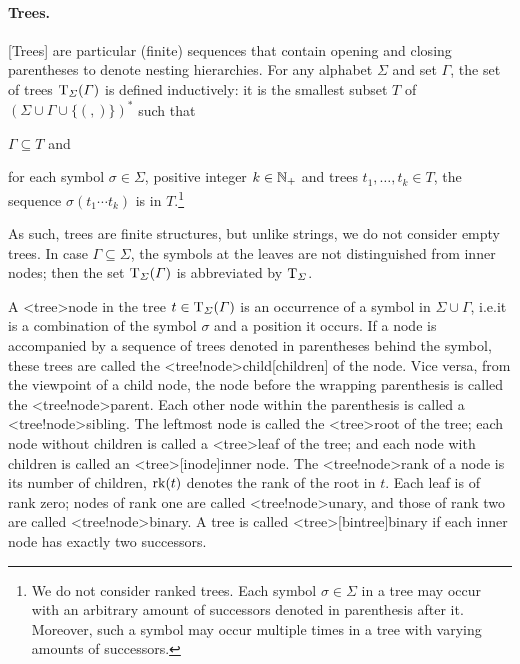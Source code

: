 \documentclass[../document.tex]{subfiles}
\begin{document}
    \paragraph{Trees.}
    [Trees] are particular (finite) sequences that contain opening and closing parentheses to denote nesting hierarchies.
    For any alphabet \(\varSigma\) and set \(\varGamma\), the set of trees \(\operatorname{T}_\varSigma(\varGamma)\) is defined inductively: it is the smallest subset \(T\) of \((\varSigma \cup \varGamma \cup \{ (, )\})^*\) such that
    \begin{inparaenum}
        \item \(\varGamma \subseteq T\) and
        \item for each symbol \(\sigma \in \varSigma\), positive integer \(k \in \mathbb{N}_+\) and trees \(t_1, \ldots, t_k \in T\), the sequence \(\sigma(t_1 \cdots t_k)\) is in \(T\).\footnote{
            We do not consider ranked trees.
            Each symbol \(\sigma \in \varSigma\) in a tree may occur with an arbitrary amount of successors denoted in parenthesis after it.
            Moreover, such a symbol may occur multiple times in a tree with varying amounts of successors.
        }
    \end{inparaenum}
    As such, trees are finite structures, but unlike strings, we do not consider empty trees.
    In case \(\varGamma \subseteq \varSigma\), the symbols at the leaves are not distinguished from inner nodes; then the set \(\operatorname{T}_\varSigma(\varGamma)\) is abbreviated by \(\operatorname{T}_\varSigma\).

    A <tree>{node} in the tree \(t \in \operatorname{T}_\varSigma(\varGamma)\) is an occurrence of a symbol in \(\varSigma \cup \varGamma\), i.e.\@ it is a combination of the symbol \(\sigma\) and a position it occurs.
    If a node is accompanied by a sequence of trees denoted in parentheses behind the symbol, these trees are called the <tree!node>{child}[children] of the node.
    Vice versa, from the viewpoint of a child node, the node before the wrapping parenthesis is called the <tree!node>{parent}.
    Each other node within the parenthesis is called a <tree!node>{sibling}.
    The leftmost node is called the <tree>{root} of the tree; each node without children is called a <tree>{leaf} of the tree; and each node with children is called an <tree>[inode]{inner node}.
    The <tree!node>{rank} of a node is its number of children, \(\operatorname{rk}(t)\) denotes the rank of the root in \(t\).
    Each leaf is of rank zero; nodes of rank one are called <tree!node>{unary}, and those of rank two are called <tree!node>{binary}.
    A tree is called <tree>[bintree]{binary} if each inner node has exactly two successors.
\end{document}
